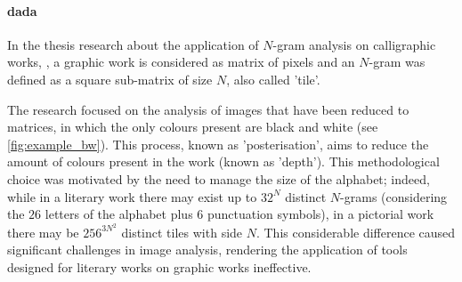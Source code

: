 \paragraph{\gls{dada}}
In the thesis research about the application of $N$-gram analysis on calligraphic works, \citep[see][]{thesis}, a graphic work is considered as matrix of pixels and an $N$-gram was defined as a square sub-matrix of size $N$, also called 'tile'.

\noindent The research focused on the analysis of images that have been reduced to matrices, in which the only colours present are black and white (see \cref{fig:example_bw}). This process, known as 'posterisation', aims to reduce the amount of colours present in the work (known as 'depth'). This methodological choice was motivated by the need to manage the size of the alphabet; indeed, while in a literary work there may exist up to $32^N$ distinct $N$-grams (considering the $26$ letters of the alphabet plus $6$ punctuation symbols), in a pictorial work there may be $256^{3N^2}$ distinct tiles with side $N$. This considerable difference caused significant challenges in image analysis, rendering the application of tools designed for literary works on graphic works ineffective.

